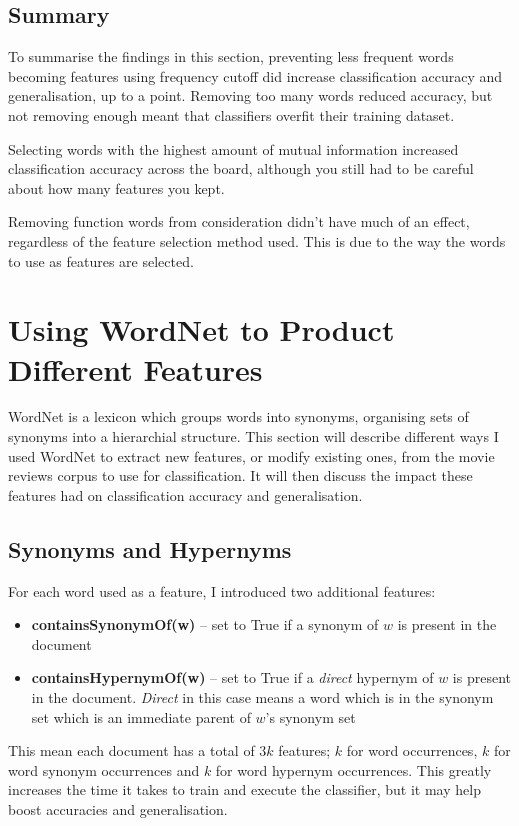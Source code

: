 \documentclass{article}
\begin{document}
\subsection{Summary}

To summarise the findings in this section, preventing less frequent words becoming features using frequency cutoff did increase classification accuracy and generalisation, up to a point. Removing too many words reduced accuracy, but not removing enough meant that classifiers overfit their training dataset.

Selecting words with the highest amount of mutual information increased classification accuracy across the board, although you still had to be careful about how many features you kept.

Removing function words from consideration didn't have much of an effect, regardless of the feature selection method used. This is due to the way the words to use as features are selected.

\section{Using WordNet to Product Different Features}

WordNet is a lexicon which groups words into synonyms, organising sets of synonyms into a hierarchial structure. This section will describe different ways I used WordNet to extract new features, or modify existing ones, from the movie reviews corpus to use for classification. It will then discuss the impact these features had on classification accuracy and generalisation.

\subsection{Synonyms and Hypernyms}

For each word used as a feature, I introduced two additional features:
\begin{itemize}
	\item \textbf{containsSynonymOf(w)} -- set to True if a synonym of $w$ is present in the document
	\item \textbf{containsHypernymOf(w)} -- set to True if a \textit{direct} hypernym of $w$ is present in the document. \textit{Direct} in this case means a word which is in the synonym set which is an immediate parent of $w$'s synonym set
	\end{itemize}
This mean each document has a total of $3k$ features; $k$ for word occurrences, $k$ for word synonym occurrences and $k$ for word hypernym occurrences. This greatly increases the time it takes to train and execute the classifier, but it may help boost accuracies and generalisation.
\end{document}
